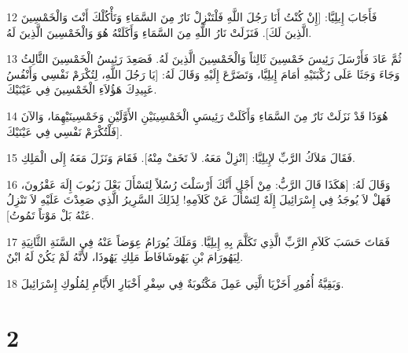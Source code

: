 \par 12 فَأَجَابَ إِيلِيَّا: [إِنْ كُنْتُ أَنَا رَجُلَ اللَّهِ فَلْتَنْزِلْ نَارٌ مِنَ السَّمَاءِ وَتَأْكُلْكَ أَنْتَ وَالْخَمْسِينَ الَّذِينَ لَكَ]. فَنَزَلَتْ نَارُ اللَّهِ مِنَ السَّمَاءِ وَأَكَلَتْهُ هُوَ وَالْخَمْسِينَ الَّذِينَ لَهُ.
\par 13 ثُمَّ عَادَ فَأَرْسَلَ رَئِيسَ خَمْسِينَ ثَالِثاً وَالْخَمْسِينَ الَّذِينَ لَهُ. فَصَعِدَ رَئِيسُ الْخَمْسِينَ الثَّالِثُ وَجَاءَ وَجَثَا عَلَى رُكْبَتَيْهِ أمَامَ إِيلِيَّا، وَتَضَرَّعَ إِلَيْهِ وَقَالَ لَهُ: [يَا رَجُلَ اللَّهِ، لِتُكْرَمْ نَفْسِي وَأَنْفُسُ عَبِيدِكَ هَؤُلاَءِ الْخَمْسِينَ فِي عَيْنَيْكَ.
\par 14 هُوَذَا قَدْ نَزَلَتْ نَارٌ مِنَ السَّمَاءِ وَأَكَلَتْ رَئِيسَيِ الْخَمْسِينَيْنِ الأَوَّلَيْنِ وَخَمْسِينَيْهِمَا، وَالآنَ فَلْتُكْرَمْ نَفْسِي فِي عَيْنَيْكَ].
\par 15 فَقَالَ مَلاَكُ الرَّبِّ لإِيلِيَّا: [انْزِلْ مَعَهُ. لاَ تَخَفْ مِنْهُ]. فَقَامَ وَنَزَلَ مَعَهُ إِلَى الْمَلِكِ.
\par 16 وَقَالَ لَهُ: [هَكَذَا قَالَ الرَّبُّ: مِنْ أَجْلِ أَنَّكَ أَرْسَلْتَ رُسُلاً لِتَسْأَلَ بَعْلَ زَبُوبَ إِلَهَ عَقْرُونَ، فَهَلْ لاَ يُوجَدُ فِي إِسْرَائِيلَ إِلَهٌ لِتَسْأَلَ عَنْ كَلاَمِهِ! لِذَلِكَ السَّرِيرُ الَّذِي صَعِدْتَ عَلَيْهِ لاَ تَنْزِلُ عَنْهُ بَلْ مَوْتاً تَمُوتُ].
\par 17 فَمَاتَ حَسَبَ كَلاَمِ الرَّبِّ الَّذِي تَكَلَّمَ بِهِ إِيلِيَّا. وَمَلَكَ يُورَامُ عِوَضاً عَنْهُ فِي السَّنَةِ الثَّانِيَةِ لِيَهُورَامَ بْنِ يَهُوشَافَاطَ مَلِكِ يَهُوذَا، لأَنَّهُ لَمْ يَكُنْ لَهُ ابْنٌ.
\par 18 وَبَقِيَّةُ أُمُورِ أَخَزْيَا الَّتِي عَمِلَ مَكْتُوبَةٌ فِي سِفْرِ أَخْبَارِ الأَيَّامِ لِمُلُوكِ إِسْرَائِيلَ.

\chapter{2}

